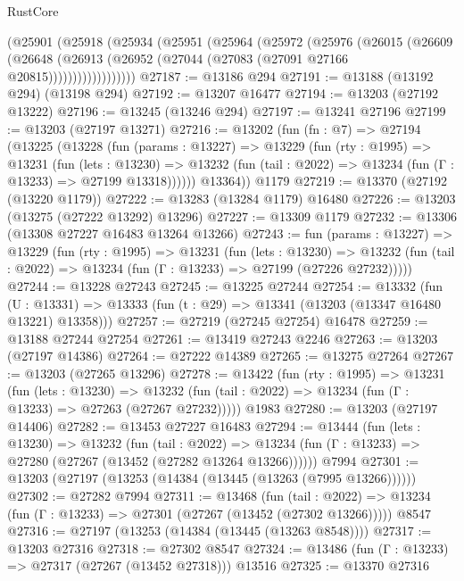 \begin{lexlean}{RustCore}
\begin{coremodule}
          (@25901
            (@25918
              (@25934
                (@25951
                  (@25964
                    (@25972
                      (@25976
                        (@26015
                          (@26609
                            (@26648
                              (@26913
                                (@26952 (@27044 (@27083 (@27091 @27166 @20815))))))))))))))))))
@27187 := @13186 @294
@27191 := @13188 (@13192 @294) (@13198 @294)
@27192 := @13207 @16477
@27194 := @13203 (@27192 @13222)
@27196 := @13245 (@13246 @294)
@27197 := @13241 @27196
@27199 := @13203 (@27197 @13271)
@27216 := @13202
    (fun (fn : @7) =>
    @27194
      (@13225
        (@13228
          (fun (params : @13227) =>
          @13229
            (fun (rty : @1995) =>
            @13231
              (fun (lets : @13230) =>
              @13232 (fun (tail : @2022) => @13234 (fun (Γ : @13233) => @27199 @13318))))))
        @13364))
    @1179
@27219 := @13370 (@27192 (@13220 @1179))
@27222 := @13283 (@13284 @1179) @16480
@27226 := @13203 (@13275 (@27222 @13292) @13296)
@27227 := @13309 @1179
@27232 := @13306 (@13308 @27227 @16483 @13264 @13266)
@27243 := fun (params : @13227) =>
  @13229
    (fun (rty : @1995) =>
    @13231
      (fun (lets : @13230) =>
      @13232 (fun (tail : @2022) => @13234 (fun (Γ : @13233) => @27199 (@27226 @27232)))))
@27244 := @13228 @27243
@27245 := @13225 @27244
@27254 := @13332
    (fun (U : @13331) => @13333 (fun (t : @29) => @13341 (@13203 (@13347 @16480 @13221) @13358)))
@27257 := @27219 (@27245 @27254) @16478
@27259 := @13188 @27244 @27254
@27261 := @13419 @27243 @2246
@27263 := @13203 (@27197 @14386)
@27264 := @27222 @14389
@27265 := @13275 @27264
@27267 := @13203 (@27265 @13296)
@27278 := @13422
    (fun (rty : @1995) =>
    @13231
      (fun (lets : @13230) =>
      @13232 (fun (tail : @2022) => @13234 (fun (Γ : @13233) => @27263 (@27267 @27232)))))
    @1983
@27280 := @13203 (@27197 @14406)
@27282 := @13453 @27227 @16483
@27294 := @13444
    (fun (lets : @13230) =>
    @13232
      (fun (tail : @2022) =>
      @13234 (fun (Γ : @13233) => @27280 (@27267 (@13452 (@27282 @13264 @13266))))))
    @7994
@27301 := @13203 (@27197 (@13253 (@14384 (@13445 (@13263 (@7995 @13266))))))
@27302 := @27282 @7994
@27311 := @13468
    (fun (tail : @2022) => @13234 (fun (Γ : @13233) => @27301 (@27267 (@13452 (@27302 @13266)))))
    @8547
@27316 := @27197 (@13253 (@14384 (@13445 (@13263 @8548))))
@27317 := @13203 @27316
@27318 := @27302 @8547
@27324 := @13486 (fun (Γ : @13233) => @27317 (@27267 (@13452 @27318))) @13516
@27325 := @13370 @27316

\end{coremodule}
\end{lexlean}
